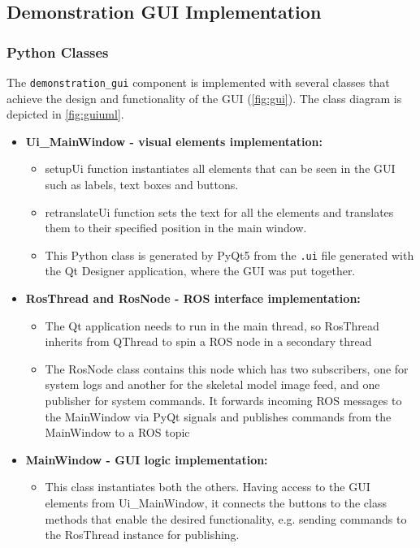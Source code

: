 \documentclass{CSSRforAfrica}
\begin{document}
\subsection{Demonstration GUI Implementation}

\subsubsection*{Python Classes}
The \texttt{demonstration\_gui} component is implemented with several classes that achieve the design and functionality of the GUI (\cref{fig:gui}). The class diagram is depicted in \cref{fig:guiuml}.

\begin{itemize}
    \item \textbf{Ui\_MainWindow - visual elements implementation:} 
    \begin{itemize}
        \item setupUi function instantiates all elements that can be seen in the GUI such as labels, text boxes and buttons. 
        \item retranslateUi function sets the text for all the elements and translates them to their specified position in the main window.
        \item  This Python class is generated by PyQt5 from the \texttt{.ui} file generated with the Qt Designer application, where the GUI was put together.  
    \end{itemize}
    \item \textbf{RosThread and RosNode - ROS interface implementation:}
    \begin{itemize}
        \item The Qt application needs to run in the main thread, so RosThread inherits from QThread to spin a ROS node in a secondary thread
        \item The RosNode class contains this node which has two subscribers, one for system logs and another for the skeletal model image feed, and one publisher for system commands. It forwards incoming ROS messages to the MainWindow via PyQt signals and publishes commands from the MainWindow to a ROS topic
    \end{itemize}
    \item \textbf{MainWindow - GUI logic implementation:}
    \begin{itemize}
        \item This class instantiates both the others. Having access to the GUI elements from Ui\_MainWindow, it connects the buttons to the class methods that enable the desired functionality, e.g. sending commands to the RosThread instance for publishing. 

\end{itemize}
\end{itemize}
\end{document}
